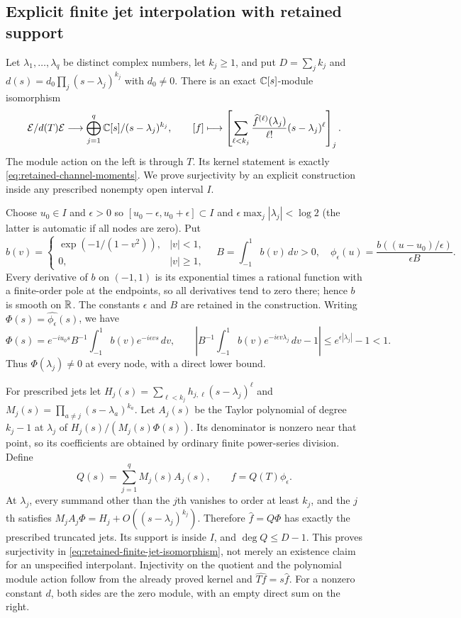 \subsection{Explicit finite jet interpolation with retained support}
Let $\lambda_1,\ldots,\lambda_q$ be distinct complex numbers,
let $k_j\ge1$, and put $D=\sum_j k_j$ and
$d(s)=d_0\prod_j(s-\lambda_j)^{k_j}$ with $d_0\ne0$.
There is an exact $\mathbb C[s]$-module isomorphism
\begin{equation}
 \mathcal E/d(T)\mathcal E
 \longrightarrow
 \bigoplus_{j=1}^q\mathbb C[s]/(s-\lambda_j)^{k_j},\qquad
 [f]\longmapsto
 \left[\sum_{\ell<k_j}
     \frac{\widehat f^{(\ell)}(\lambda_j)}{\ell!}
                  (s-\lambda_j)^\ell\right]_j.
 \label{eq:retained-finite-jet-isomorphism}
\end{equation}
The module action on the left is through $T$.
Its kernel statement is exactly
\eqref{eq:retained-channel-moments}. We prove surjectivity by an
explicit construction inside any prescribed nonempty open interval $I$.

Choose $u_0\in I$ and $\epsilon>0$ so
$[u_0-\epsilon,u_0+\epsilon]\subset I$ and
$\epsilon\max_j|\lambda_j|<\log2$ (the latter is automatic if
all nodes are zero). Put
\[
 b(v)=\begin{cases}\exp(-1/(1-v^2)),&|v|<1,\\0,&|v|\ge1,
       \end{cases}
 \quad B=\int_{-1}^1b(v)\,dv>0,\quad
 \phi_\epsilon(u)=\frac{b((u-u_0)/\epsilon)}{\epsilon B}.
\]
Every derivative of $b$ on $(-1,1)$ is its exponential times a
rational function with a finite-order pole at the endpoints, so all
derivatives tend to zero there; hence $b$ is smooth on $\mathbb R$.
The constants $\epsilon$ and $B$ are retained in the construction.
Writing $\Phi(s)=\widehat{\phi_\epsilon}(s)$, we have
\[
 \Phi(s)=e^{-iu_0s}B^{-1}\int_{-1}^1b(v)e^{-i\epsilon vs}\,dv,
 \qquad
 \left|B^{-1}\int_{-1}^1b(v)e^{-i\epsilon v\lambda_j}\,dv-1\right|
 \le e^{\epsilon|\lambda_j|}-1<1.
\]
Thus $\Phi(\lambda_j)\ne0$ at every node, with a direct lower bound.

For prescribed jets let
$H_j(s)=\sum_{\ell<k_j}h_{j,\ell}(s-\lambda_j)^\ell$ and
$M_j(s)=\prod_{a\ne j}(s-\lambda_a)^{k_a}$.
Let $A_j(s)$ be the Taylor polynomial of degree $k_j-1$ at
$\lambda_j$ of $H_j(s)/(M_j(s)\Phi(s))$.
Its denominator is nonzero near that point, so its coefficients
are obtained by ordinary finite power-series division. Define
\begin{equation}
 Q(s)=\sum_{j=1}^qM_j(s)A_j(s),\qquad
 f=Q(T)\phi_\epsilon.
 \label{eq:retained-explicit-Hermite-lift}
\end{equation}
At $\lambda_j$, every summand other than the $j$th vanishes to
order at least $k_j$, and the $j$th satisfies
$M_jA_j\Phi=H_j+O((s-\lambda_j)^{k_j})$.
Therefore $\widehat f=Q\Phi$ has exactly the prescribed truncated
jets. Its support is inside $I$, and $\deg Q\le D-1$.
This proves surjectivity in
\eqref{eq:retained-finite-jet-isomorphism}, not merely an existence
claim for an unspecified interpolant. Injectivity on the quotient
and the polynomial module action follow from the already proved
kernel and $\widehat{Tf}=s\widehat f$.
For a nonzero constant $d$, both sides are the zero module, with
an empty direct sum on the right.

